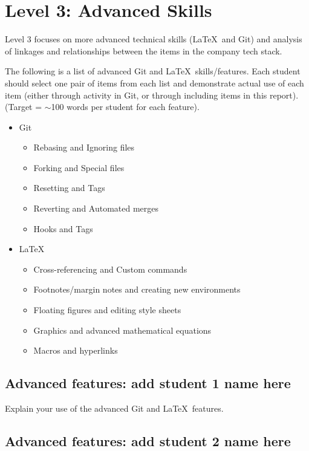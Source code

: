 \documentclass[a4paper, 11pt]{report}
\begin{document}

\newpage
\section{Level 3: Advanced Skills}

Level 3 focuses on more advanced technical skills (\LaTeX\ and Git) and analysis of linkages and relationships between the items in the company tech stack.

The following is a list of advanced Git and \LaTeX\ skills/features. Each student should select one pair of items from each list and demonstrate actual use of each item (either through activity in Git, or through including items in this report). (Target = $\sim$100 words per student for each feature).
\begin{itemize}
    \item Git
    \begin{itemize}
        \item Rebasing and Ignoring files
        \item Forking and Special files
        \item Resetting and Tags
        \item Reverting and Automated merges
        \item Hooks and Tags
    \end{itemize}
    \item \LaTeX\ 
    \begin{itemize}
        \item Cross-referencing and Custom commands
        \item Footnotes/margin notes and creating new environments
        \item Floating figures and editing style sheets
        \item Graphics and advanced mathematical equations
        \item Macros and hyperlinks
    \end{itemize}
\end{itemize}

\subsection{Advanced features: add student 1 name here}

Explain your use of the advanced Git and \LaTeX\ features. 

\subsection{Advanced features: add student 2 name here}
\end{document}
